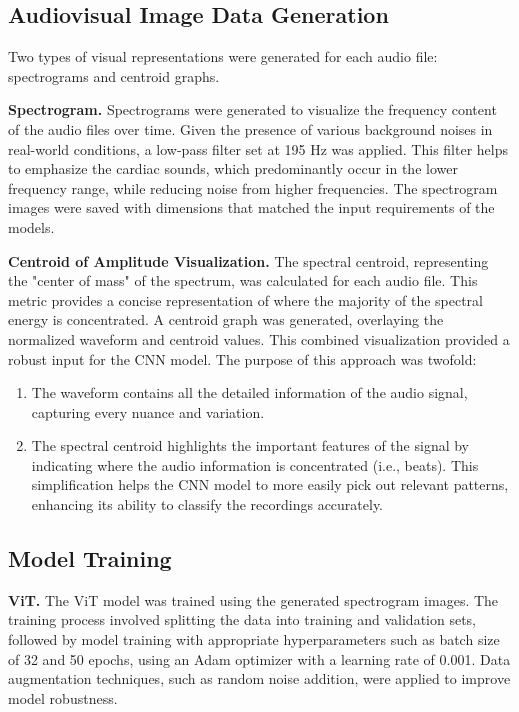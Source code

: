 \subsection{Audiovisual Image Data Generation}
Two types of visual representations were generated for each audio file: spectrograms and centroid graphs.

\textbf{Spectrogram.}
Spectrograms were generated to visualize the frequency content of the audio files over time. Given the presence of various background noises in real-world conditions, a low-pass filter set at 195 Hz was applied. This filter helps to emphasize the cardiac sounds, which predominantly occur in the lower frequency range, while reducing noise from higher frequencies. The spectrogram images were saved with dimensions that matched the input requirements of the models.

\textbf{Centroid of Amplitude Visualization.}
The spectral centroid, representing the "center of mass" of the spectrum, was calculated for each audio file. This metric provides a concise representation of where the majority of the spectral energy is concentrated. A centroid graph was generated, overlaying the normalized waveform and centroid values. This combined visualization provided a robust input for the CNN model. The purpose of this approach was twofold:
\begin{enumerate}
    \item The waveform contains all the detailed information of the audio signal, capturing every nuance and variation.
    \item The spectral centroid highlights the important features of the signal by indicating where the audio information is concentrated (i.e., beats). This simplification helps the CNN model to more easily pick out relevant patterns, enhancing its ability to classify the recordings accurately.
\end{enumerate}

\subsection{Model Training}
\textbf{ViT.}
The ViT model was trained using the generated spectrogram images. The training process involved splitting the data into training and validation sets, followed by model training with appropriate hyperparameters such as batch size of 32 and 50 epochs, using an Adam optimizer with a learning rate of 0.001. Data augmentation techniques, such as random noise addition, were applied to improve model robustness.

